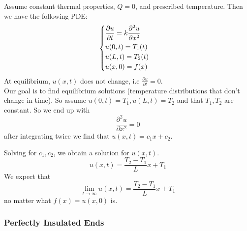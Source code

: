 \documentclass{article}
\begin{document}
	Assume constant thermal properties, $ Q=0 $, and prescribed temperature. Then we have the following PDE:
	\[
		\begin{cases}
			\dfrac{\partial u}{\partial t} = k \dfrac{\partial^2 u}{\partial x^2} \vspace{1mm} \\
			u(0,t) = T_1(t) \\
			u(L,t) = T_2(t) \\
			u(x,0) = f(x)
		\end{cases}
	\]
	At equilibrium, $ u(x,t) $ does not change, i.e $ \frac{\partial u}{\partial t} = 0 $. \\
	
	Our goal is to find equilibrium solutions (temperature distributions that don't change in time). So assume $ u(0,t) = T_1, u(L,t) = T_2 $ and that $ T_1, T_2 $ are constant. So we end up with
	\[
		\frac{\partial^2 u}{\partial x^2} = 0
	\]
	after integrating twice we find that $ u(x,t) = c_1 x + c_2 $.
	
	\begin{center}
	\end{center}
	Solving for $ c_1, c_2 $, we obtain a solution for $ u(x,t) $.
	\[
		u(x,t) = \frac{T_2 - T_1}{L} x + T_1
	\]
	We expect that
	\[
		\lim\limits_{t \to \infty} u(x,t) = \frac{T_2 - T_1}{L} x + T_1
	\]
	no matter what $ f(x) = u(x,0) $ is.
	
	
	\subsubsection{Perfectly Insulated Ends}
	
\end{document}

